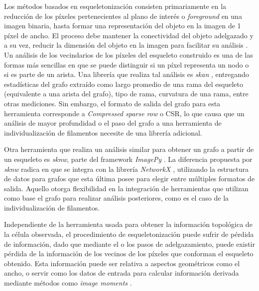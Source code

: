 Los m\'etodos basados en esqueletonizaci\'on consisten primariamente en la reducci\'on de los p\'ixeles pertenecientes al plano de inter\'es o {\it foreground} en una imagen binaria, hasta formar una representaci\'on del objeto en la imagen de 1 p\'ixel de ancho. El proceso debe mantener la conectividad del objeto adelgazado y a su vez, reducir la dimensi\'on del objeto en la imagen para facilitar su an\'alisis \cite{saha2017skeletonization}. Un an\'alisis de los vecindarios de los p\'ixeles del esqueleto construido es una de las formas m\'as sencillas en que se puede distinguir si un p\'ixel representa un nodo o si es parte de un arista. Una librer\'ia que realiza tal an\'alisis es {\it skan} \cite{nunez2018new}, entregando estad\'isticas del grafo extra\'ido como largo promedio de una rama del esqueleto (equivalente a una arista del grafo), tipo de rama, curvatura de una rama, entre otras mediciones. Sin embargo, el formato de salida del grafo para esta herramienta corresponde a {\it Compressed sparse row} o CSR, lo que causa que un an\'alisis de mayor profundidad o el paso del grafo a una herramienta de individualizaci\'on de filamentos necesite de una librer\'ia adicional. 


Otra herramienta que realiza un an\'alisis similar para obtener un grafo a partir de un esqueleto es {\it sknw}, parte del framework {\it ImagePy} \cite{wang2018imagepy}. La diferencia propuesta por {\it sknw} radica en que se integra con la librer\'ia {\it NetworkX} \cite{hagberg2008exploring}, utilizando la estructura de datos para grafos que esta \'ultima posee para elegir entre m\'ultiples formatos de salida. Aquello otorga flexibilidad en la integraci\'on de herramientas que utilizan como base el grafo para realizar an\'alisis posteriores, como es el caso de la individualizaci\'on de filamentos.


Independiente de la herramienta usada para obtener la informaci\'on topol\'ogica de la c\'elula observada, el procedimiento de esqueletonizaci\'on puede sufrir de p\'erdida de informaci\'on, dado que mediante el o los pasos de adelgazamiento, puede existir p\'erdida de la informaci\'on de los vecinos de los p\'ixeles que conforman el esqueleto obtenido. Esta informaci\'on puede ser relativa a aspectos geom\'etricos como el ancho, o servir como los datos de entrada para calcular informaci\'on derivada mediante m\'etodos como {\it image moments} \cite{flusser2009moments}\cite{chaumette2004image}.

